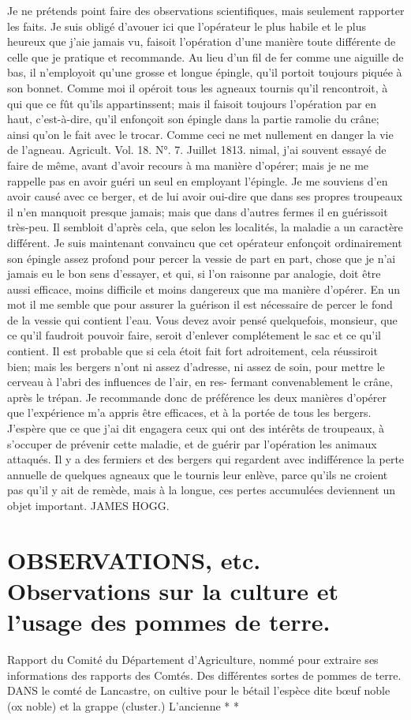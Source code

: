 Je ne prétends point faire des observations scientifiques, mais seulement rapporter les faits. Je suis obligé d'avouer ici que l'opérateur le plus habile et le plus heureux que j'aie jamais vu, faisoit l'opération d'une manière toute différente de celle que je pratique et recommande. Au lieu d'un fil de fer comme une aiguille de bas, il n'employoit qu'une grosse et longue épingle, qu'il portoit toujours piquée à son bonnet. Comme moi il opéroit tous les agneaux tournis qu'il rencontroit, à qui que ce fût qu'ils appartinssent; mais il faisoit toujours l'opération par en haut, c'est-à-dire, qu'il enfonçoit son épingle dans la partie ramolie du crâne; ainsi qu'on le fait avec le trocar. Comme ceci ne met nullement en danger la vie de l'agneau.
Agricult. Vol. 18. N°. 7. Juillet 1813.\setcounter{page}{258} nimal, j'ai souvent essayé de faire de même, avant d'avoir recours à ma manière d'opérer; mais je ne me rappelle pas en avoir guéri un seul en employant l'épingle. Je me souviens d'en avoir causé avec ce berger, et de lui avoir oui-dire que dans ses propres troupeaux il n'en manquoit presque jamais; mais que dans d'autres fermes il en guérissoit très-peu. Il sembloit d'après cela, que selon les localités, la maladie a un caractère différent. Je suis maintenant convaincu que cet opérateur enfonçoit ordinairement son épingle assez profond pour percer la vessie de part en part, chose que je n'ai jamais eu le bon sens d'essayer, et qui, si l'on raisonne par analogie, doit être aussi efficace, moins difficile et moins dangereux que ma manière d'opérer. En un mot il me semble que pour assurer la guérison il est nécessaire de percer le fond de la vessie qui contient l'eau. Vous devez avoir pensé quelquefois, monsieur, que ce qu'il faudroit pouvoir faire, seroit d'enlever complétement le sac et ce qu'il contient. Il est probable que si cela étoit fait fort adroitement, cela réussiroit bien; mais les bergers n'ont ni assez d'adresse, ni assez de soin, pour mettre le cerveau à l'abri des influences de l'air, en res-\setcounter{page}{259} fermant convenablement le crâne, après le trépan. Je recommande donc de préférence les deux manières d'opérer que l'expérience m'a appris être efficaces, et à la portée de tous les bergers. J'espère que ce que j'ai dit engagera ceux qui ont des intérêts de troupeaux, à s'occuper de prévenir cette maladie, et de guérir par l'opération les animaux attaqués. Il y a des fermiers et des bergers qui regardent avec indifférence la perte annuelle de quelques agneaux que le tournis leur enlève, parce qu'ils ne croient pas qu'il y ait de remède, mais à la longue, ces pertes accumulées deviennent un objet important.
JAMES HOGG.
\section{OBSERVATIONS, etc. Observations sur la culture et l'usage des pommes de terre.}
Rapport du Comité du Département d'Agriculture, nommé pour extraire ses informations des rapports des Comtés.
Des différentes sortes de pommes de terre.
DANS le comté de Lancastre, on cultive pour le bétail l'espèce dite bœuf noble (ox noble) et la grappe (cluster.) L'ancienne
* *